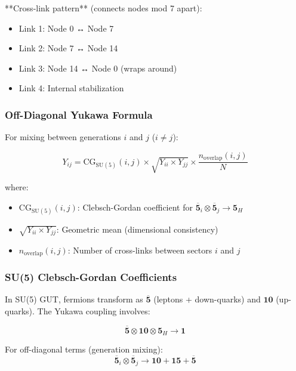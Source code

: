 \documentclass[12pt,a4paper]{article}
\begin{document}
**Cross-link pattern** (connects nodes mod 7 apart):
\begin{itemize}
\item Link 1: Node 0 ↔ Node 7
\item Link 2: Node 7 ↔ Node 14
\item Link 3: Node 14 ↔ Node 0 (wraps around)
\item Link 4: Internal stabilization
\end{itemize}

\subsubsection{Off-Diagonal Yukawa Formula}

For mixing between generations $i$ and $j$ ($i \neq j$):

\begin{equation}
Y_{ij} = \mathrm{CG}_{\mathrm{SU(5)}}(i,j) \times \sqrt{Y_{ii} \times Y_{jj}} \times \frac{n_{\mathrm{overlap}}(i,j)}{N}
\end{equation}

where:
\begin{itemize}
\item $\mathrm{CG}_{\mathrm{SU(5)}}(i,j)$: Clebsch-Gordan coefficient for $\mathbf{\overline{5}}_i \otimes \mathbf{\overline{5}}_j \to \mathbf{5}_H$
\item $\sqrt{Y_{ii} \times Y_{jj}}$: Geometric mean (dimensional consistency)
\item $n_{\mathrm{overlap}}(i,j)$: Number of cross-links between sectors $i$ and $j$
\end{itemize}

\subsubsection{SU(5) Clebsch-Gordan Coefficients}

In SU(5) GUT, fermions transform as $\mathbf{\overline{5}}$ (leptons + down-quarks) and $\mathbf{10}$ (up-quarks). The Yukawa coupling involves:

\begin{equation}
\mathbf{\overline{5}} \otimes \mathbf{10} \otimes \mathbf{5}_H \to \mathbf{1}
\end{equation}

For off-diagonal terms (generation mixing):
\begin{equation}
\mathbf{\overline{5}}_i \otimes \mathbf{\overline{5}}_j \to \mathbf{10} + \mathbf{15} + \mathbf{\overline{5}}
\end{equation}
\end{document}
